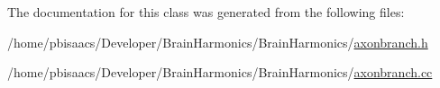 The documentation for this class was generated from the following files\+:\begin{DoxyCompactItemize}
\item 
/home/pbisaacs/\+Developer/\+Brain\+Harmonics/\+Brain\+Harmonics/\mbox{\hyperlink{axonbranch_8h}{axonbranch.\+h}}\item 
/home/pbisaacs/\+Developer/\+Brain\+Harmonics/\+Brain\+Harmonics/\mbox{\hyperlink{axonbranch_8cc}{axonbranch.\+cc}}\end{DoxyCompactItemize}
